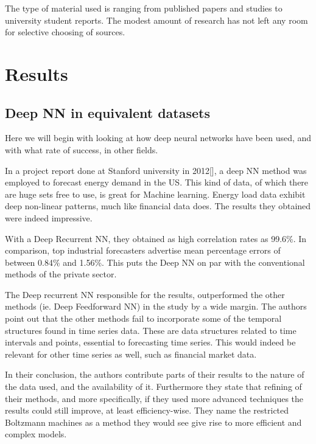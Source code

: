 The type of material used is ranging from published papers and studies to university student reports. The modest amount of research has not left any room for selective choosing of sources.




\newpage

\section{Results}
\subsection{Deep NN in equivalent datasets}
Here we will begin with looking at how deep neural networks have been used, and with what rate of success, in other fields.

In a project report done at Stanford university in 2012[], a deep NN method was employed to forecast energy demand in the US. This kind of data, of which there are huge sets free to use, is great for Machine learning. Energy load data exhibit deep non-linear patterns, much like financial data does. The results they obtained were indeed impressive.

With a Deep Recurrent NN, they obtained as high correlation rates as 99.6\%. In comparison, top industrial forecasters advertise mean percentage errors of between 0.84\% and 1.56\%. This puts the Deep NN on par with the conventional methods of the private sector.

The Deep recurrent NN responsible for the results, outperformed the other methods (ie. Deep Feedforward NN) in the study by a wide margin. The authors point out that the other methods fail to incorporate some of the temporal structures found in time series data. These are data structures related to time intervals and points, essential to forecasting time series. This would indeed be relevant for other time series as well, such as financial market data.

In their conclusion, the authors contribute parts of their results to the nature of the data used, and the availability of it. Furthermore they state that refining of their methods, and more specifically, if they used more advanced techniques the results could still improve, at least efficiency-wise. They name the restricted Boltzmann machines as a method they would see give rise to more efficient and complex models.

